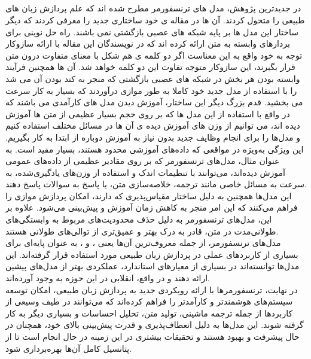 \subsection{}	
در جدیدترین پژوهش، مدل های ترنسفورمر مطرح شده اند که علم پردازش زبان های طبیعی را متحول کردند. آن ها در
مقاله ی خود ساختاری جدید را معرفی کردند که دیگر ساختار این مدل ها بر پایه شبکه های عصبی بازگشتی نمی باشند.
راه حل نوینی برای بردارهای وابسته به متن ارائه کرده اند که در 
نویسندگان این مقاله با ارائه سازوکار توجه به خود
واقع به این معناست اگر دو کلمه ی هم شکل با معنای متفاوت درون متن قرار بگیرند، این سازوکار متوجه تفاوت این دو کلمه
خواهد شد. آن ها همچنین فرآیند وابسته بودن هر بخش در شبکه های عصبی بازگشتی که منجر به کند بودن آن می شد را
با استفاده از مدل جدید خود کاملا به طور موازی درآوردند که بسیار به کار سرعت می بخشید.
قدم بزرگ دیگر این ساختار، آموزش دیدن مدل های کارآمدی می باشند که در واقع با استفاده
از این مدل ها که بر روی حجم بسیار عظیمی از متن ها آموزش دیده اند، می توانیم از وزن های آموزش دیده ی آن ها در مسائل مختلف استفاده کنیم و مدل‌ها را برای انجام وظایف جدید بدون نیاز به آموزش دوباره از ابتدا به کار بگیریم. این ویژگی به‌ویژه در مواقعی که داده‌های آموزشی محدود هستند، بسیار مفید است. به عنوان مثال، مدل‌های ترنسفورمر که بر روی مقادیر عظیمی از داده‌های عمومی آموزش دیده‌اند، می‌توانند با تنظیمات اندک و استفاده از وزن‌های یادگیری‌شده، به سرعت به مسائل خاصی مانند ترجمه، خلاصه‌سازی متن، یا پاسخ به سوالات پاسخ دهند.
\\
این مدل‌ها همچنین به دلیل ساختار مقیاس‌پذیری که دارند، امکان پردازش موازی را فراهم می‌کنند که این امر منجر به کاهش زمان آموزش و پیش‌بینی می‌شود. علاوه بر این، مدل‌های ترنسفورمر به دلیل حذف محدودیت‌های مربوط به وابستگی‌های طولانی‌مدت در متن، قادر به درک بهتر و عمیق‌تری از توالی‌های طولانی هستند.
\\
مدل‌های ترنسفورمر، از جمله معروف‌ترین آن‌ها یعنی ،  و ، به عنوان پایه‌ای برای بسیاری از کاربردهای عملی در پردازش زبان طبیعی مورد استفاده قرار گرفته‌اند. این مدل‌ها توانسته‌اند در بسیاری از معیارهای استاندارد، عملکردی بهتر از مدل‌های پیشین ارائه دهند و در واقع، انقلابی در این حوزه به وجود آورده‌اند.
\\
در نهایت، ترنسفورمرها با ارائه رویکردی جدید به پردازش زبان طبیعی، امکان توسعه سیستم‌های هوشمندتر و کارآمدتر را فراهم کرده‌اند که می‌توانند در طیف وسیعی از کاربردها از جمله ترجمه ماشینی، تولید متن، تحلیل احساسات و بسیاری دیگر به کار گرفته شوند. این مدل‌ها به دلیل انعطاف‌پذیری و قدرت پیش‌بینی بالای خود، همچنان در حال پیشرفت و بهبود هستند و تحقیقات بیشتری در این زمینه در حال انجام است تا از پتانسیل کامل آن‌ها بهره‌برداری شود.
\cite{vaswani2017attention}

